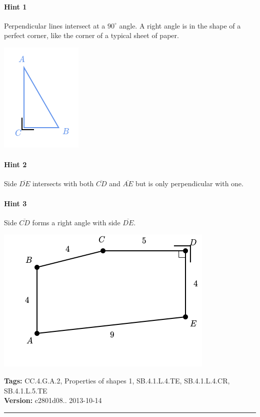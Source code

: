 \documentclass[twocolumn,10pt]{article}
\def\shrinkfactor{0.55}
\begin{document}
\paragraph{Hint 1}Perpendicular lines intersect at a $90 ^\circ$ angle.  
A right angle is in the shape of a perfect corner, like the corner of a typical sheet of paper.


\includegraphics[scale=\shrinkfactor]{figures/497661f48f441186b5e021d8ca8c4f0c7449214f.png}

\paragraph{Hint 2}Side $\overline{DE}$ intersects with both $\overline{CD}$ and $\overline{AE}$ but is only perpendicular with one.

\paragraph{Hint 3}Side $\overline{CD}$ forms a right angle with side $\overline{DE}$.

\includegraphics[scale=\shrinkfactor]{figures/e2ebf7a945c31e610b7b3bc519435119ab626207.png}



\medskip
\noindent
\textbf{Tags:} {\footnotesize CC.4.G.A.2, Properties of shapes 1, SB.4.1.L.4.TE, SB.4.1.L.4.CR, SB.4.1.L.5.TE}\\
\textbf{Version:} c2801d08.. 2013-10-14
\smallskip\hrule
\end{document}
